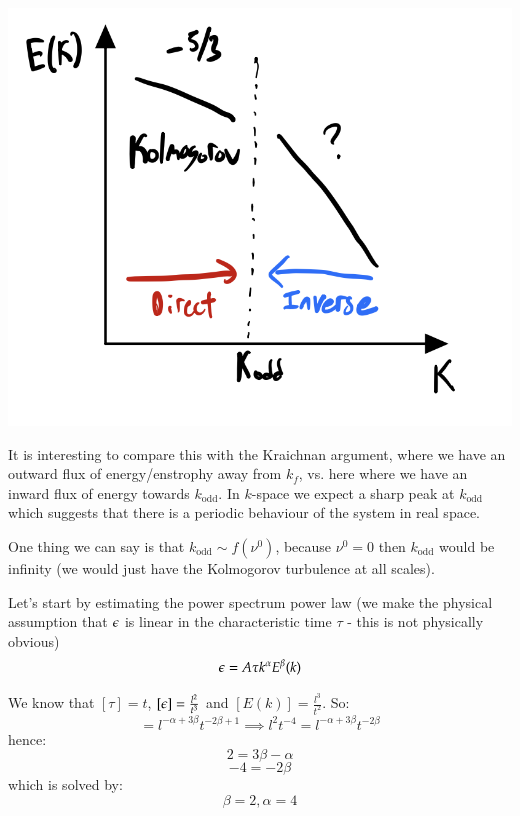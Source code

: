 \begin{center}
    \includegraphics[scale=0.4]{Lectures/Images/lec15-oddpowerspectrum.png}
\end{center}

It is interesting to compare this with the Kraichnan argument, where we have an outward flux of energy/enstrophy away from $k_f$, vs. here where we have an inward flux of energy towards $k_{\text{odd}}$. In $k$-space we expect a sharp peak at $k_{\text{odd}}$ which suggests that there is a periodic behaviour of the system in real space.

One thing we can say is that $k_{\text{odd}} \sim f(\nu^0)$, because $\nu^0 = 0$ then $k_{\text{odd}}$ would be infinity (we would just have the Kolmogorov turbulence at all scales).

Let's start by estimating the power spectrum power law (we make the physical assumption that $\epsilon$ is linear in the characteristic time $\tau$ - this is not physically obvious)
\begin{equation}
    \epsilon = A\tau k^\alpha E^\beta(k)
\end{equation}

We know that $[\tau] = t$, $[\epsilon] = \frac{l^2}{t^3}$ and $[E(k)] = \frac{l^3}{t^2}$. So:
\begin{equation}
    [\e] = l^{-\alpha + 3\beta} t^{-2\beta + 1} \implies l^2 t^{-4} = l^{-\alpha + 3\beta}t^{-2\beta}
\end{equation}
hence:
\begin{equation}
    2 = 3\beta - \alpha
\end{equation}
\begin{equation}
    -4 = -2\beta
\end{equation}
which is solved by:
\begin{equation}
    \beta = 2, \alpha = 4
\end{equation}

